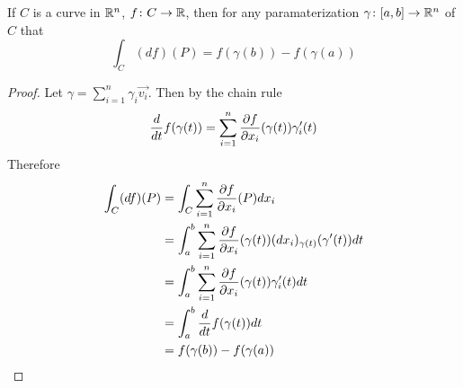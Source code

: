 \documentclass[notes.tex]{subfiles}
\begin{document}
\begin{theorem}
    If $C$ is a curve in $\mathbb{R}^n$, $f\colon C \to \mathbb{R}$, then for any paramaterization $\gamma\colon [a, b] \to \mathbb{R}^n$ of $C$ that
    \[
        \int_C (df)(P) = f(\gamma(b)) - f(\gamma(a))
    \]
\end{theorem}
\begin{proof}
    Let $\gamma = \sum_{i = 1}^n \gamma_i\vec{v_i}$. Then by the chain rule
    \[
        \frac{d}{dt} f(\gamma(t)) = \sum_{i = 1}^n \frac{\partial f}{\partial x_i}(\gamma(t))\gamma'_i(t)
    \]
    Therefore
    \begin{align*}
        \int_C (df)(P)
        &= \int_C \sum_{i = 1}^n \frac{\partial f}{\partial x_i}(P)dx_i \\
        &= \int_a^b \sum_{i = 1}^n \frac{\partial f}{\partial x_i}(\gamma(t))(dx_i)_{\gamma(t)}(\gamma'(t))dt \\
        &= \int_a^b \sum_{i = 1}^n \frac{\partial f}{\partial x_i}(\gamma(t)) \gamma'_i(t) dt \\
        &= \int_a^b \frac{d}{dt}f(\gamma(t))dt \\
        &= f(\gamma(b)) - f(\gamma(a))
    \end{align*}
\end{proof}
\end{document}
